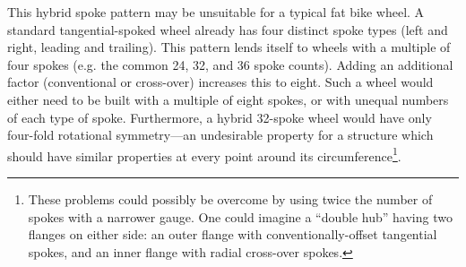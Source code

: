 \documentclass[\rootdir/thesis.tex]{subfiles}
\begin{document}
This hybrid spoke pattern may be unsuitable for a typical fat bike wheel. A standard tangential-spoked wheel already has four distinct spoke types (left and right, leading and trailing). This pattern lends itself to wheels with a multiple of four spokes (e.g. the common 24, 32, and 36 spoke counts). Adding an additional factor (conventional or cross-over) increases this to eight. Such a wheel would either need to be built with a multiple of eight spokes, or with unequal numbers of each type of spoke. Furthermore, a hybrid 32-spoke wheel would have only four-fold rotational symmetry---an undesirable property for a structure which should have similar properties at every point around its circumference\footnote{These problems could possibly be overcome by using twice the number of spokes with a narrower gauge. One could imagine a ``double hub'' having two flanges on either side: an outer flange with conventionally-offset tangential spokes, and an inner flange with radial cross-over spokes.}.
\end{document}

